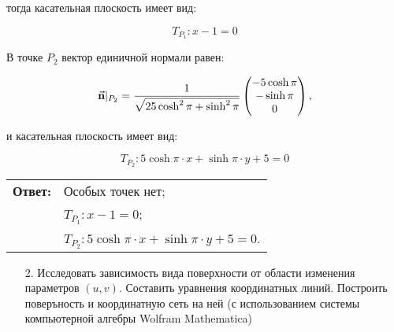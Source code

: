 \documentclass[12pt,a4paper]{article}
\begin{document}
    \noindent тогда касательная плоскость имеет вид: 

    \[
        T_{P_1}: x - 1 = 0
    \]


    В точке $ {P_2} $ вектор единичной нормали равен:

    \[
        \vec{\textbf n}|_{P_2} = \frac{1}{\sqrt{25 \cosh^2 \pi + \sinh^2 \pi}}
        \begin{pmatrix}
            -5 \cosh \pi
            \\
            -\sinh \pi
            \\
            0
        \end{pmatrix}, 
    \]

    \noindent и касательная плоскость имеет вид: 

    \[
        T_{P_2}: 5 \cosh \pi \cdot x + \sinh \pi \cdot y + 5 = 0
    \]

    \bigskip

    \begin{flushright}
        \begin{tabular}{rl}
            \textbf{Ответ:} & Особых точек нет;

            \\

                            & $ T_{P_1}: x - 1 = 0 $;

            \\

                            & $ T_{P_2}: 5 \cosh \pi \cdot x + \sinh \pi \cdot y + 5 = 0 $.
        \end{tabular}
    \end{flushright}

    \pagebreak

    \begin{enumerate}
        \item[2.] Исследовать зависимость вида поверхности от области изменения параметров $ (u, v) $. Составить уравнения координатных линий. Построить поверъность и координатную сеть на ней (с использованием системы компьютерной алгебры Wolfram Mathematica)
    \end{enumerate}
\end{document}
